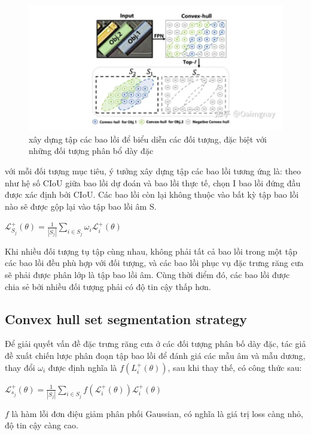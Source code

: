 \documentclass[12pt,a4paper,openany,oneside]{report}
\begin{document}
\begin{figure}[ht!]
	\begin{center}
		\includegraphics[width=445px]{./construction_convex_hull_set.jpg}
		\caption{xây dựng tập các bao lồi để biểu diễn các đối tượng, đặc biệt với những đối tượng phân bổ dày đặc}
		\label{fig_dhandang1}
	\end{center}
\end{figure} 
với mỗi đối tượng mục tiêu, ý tưởng xây dựng tập các bao lồi tương ứng là: theo như hệ số CIoU giữa bao lồi dự đoán và bao lồi thực tế, chọn I bao lồi đứng đầu được xác định bởi CIoU. Các bao lồi còn lại không thuộc vào bất kỳ tập bao lồi nào sẽ được gộp lại vào tập bao lồi âm S.
\begin{center}
$\mathcal{L}_{S_j}^{+}(\theta)=\frac{1}{\left|S_j\right|} \sum_{i \in S_j} \omega_i \mathcal{L}_i^{+}(\theta)$
\end{center}
Khi nhiều đối tượng tụ tập cùng nhau, không phải tất cả bao lồi trong một tập các bao lồi đều phù hợp với đối tượng, và các bao lồi phục vụ đặc trưng răng cưa sẽ phải được phân lớp là tập bao lồi âm. Cùng thời điểm đó, các bao lồi được chia sẻ bởi nhiều đối tượng phải có độ tin cậy thấp hơn.
\subsection{Convex hull set segmentation strategy}
Để giải quyết vấn đề đặc trưng răng cưa ở các đối tượng phân bố dày đặc, tác giả đề xuất chiến lược phân đoạn tập bao lồi để đánh giá các mẫu âm và mẫu dương, thay đổi $\omega_i$ được định nghĩa là $f\left(L_i^{+}(\theta)\right)$, sau khi thay thế, có công thức sau:
\begin{center}
	$\mathcal{L}_{s_j}^{+}(\theta)=\frac{1}{\left|S_j\right|} \sum_{i \in S_j} f\left(\mathcal{L}_i^{+}(\theta)\right) \mathcal{L}_i^{+}(\theta)$
\end{center}
$f$ là hàm lỗi đơn điệu giảm phân phối Gaussian, có nghĩa là giá trị loss càng nhỏ, độ tin cậy càng cao.
\end{document}
